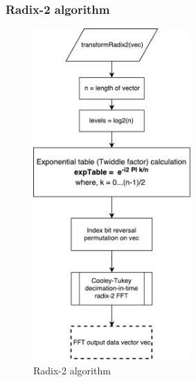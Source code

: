 \subsubsection{Radix-2 algorithm}
\begin{figure}[h]
	\centering
	\includegraphics[width=6cm]{./algorithms/fft/figures/Radix2.pdf}
	\caption{Radix-2 algorithm}\label{Radix-2}
\end{figure}

\newpage
